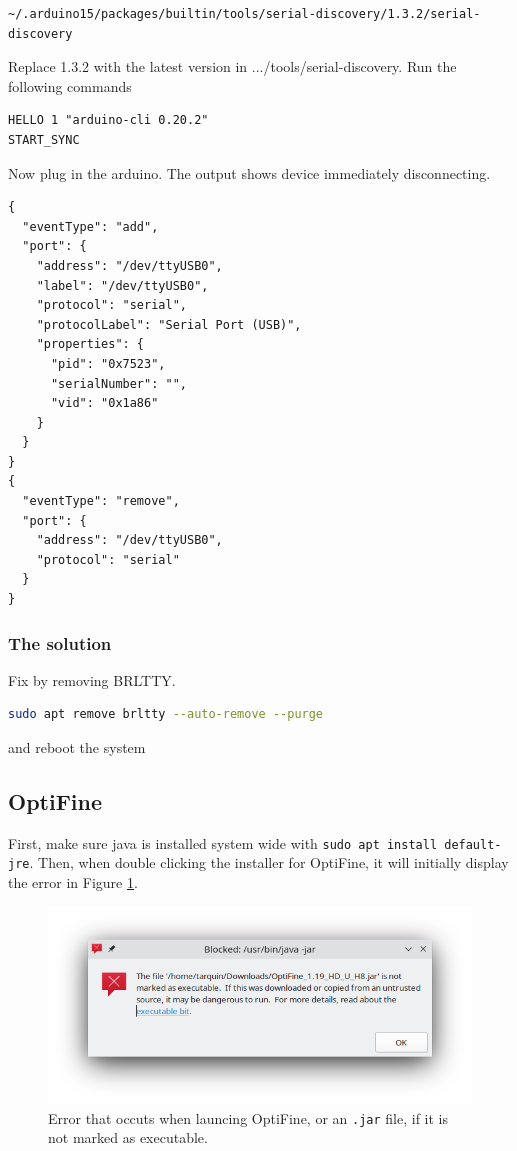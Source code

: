 \documentclass[a4paper, 12pt]{article}
\begin{document}
\begin{lstlisting}
~/.arduino15/packages/builtin/tools/serial-discovery/1.3.2/serial-discovery
\end{lstlisting}

Replace 1.3.2 with the latest version in .../tools/serial-discovery.
Run the following commands

\begin{lstlisting}
HELLO 1 "arduino-cli 0.20.2"
START_SYNC    
\end{lstlisting}

Now plug in the arduino.
The output shows device immediately disconnecting.

\begin{lstlisting}
{
  "eventType": "add",
  "port": {
    "address": "/dev/ttyUSB0",
    "label": "/dev/ttyUSB0",
    "protocol": "serial",
    "protocolLabel": "Serial Port (USB)",
    "properties": {
      "pid": "0x7523",
      "serialNumber": "",
      "vid": "0x1a86"
    }
  }
}
{
  "eventType": "remove",
  "port": {
    "address": "/dev/ttyUSB0",
    "protocol": "serial"
  }
}
\end{lstlisting}

\subsubsection{The solution}

Fix by removing BRLTTY.

\begin{lstlisting}[language=Bash]
sudo apt remove brltty --auto-remove --purge
\end{lstlisting}

and reboot the system

\subsection{OptiFine}

First, make sure java is installed system wide with \texttt{sudo apt install default-jre}. Then, when
double clicking the installer for OptiFine, it will initially display the error in Figure \ref{fig:optifine}.

\begin{figure}[h]
 \centering
 \includegraphics[width=0.6\linewidth]{images/optifine}
 \caption{Error that occuts when launcing OptiFine, or an \texttt{.jar} file, if it is not marked as executable.}
 \label{fig:optifine}
\end{figure}
\end{document}
